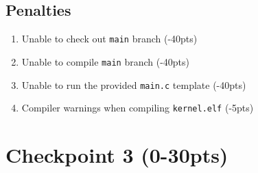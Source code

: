 \documentclass{article}
\begin{document}
\subsection*{Penalties}
    \begin{enumerate}
        \item Unable to check out \texttt{main} branch (-40pts)
        \item Unable to compile \texttt{main} branch (-40pts)
        \item Unable to run the provided \texttt{main.c} template (-40pts)
        \item Compiler warnings when compiling \texttt{kernel.elf} (-5pts)
    \end{enumerate}




\section*{Checkpoint 3 (0-30pts)}
\end{document}
